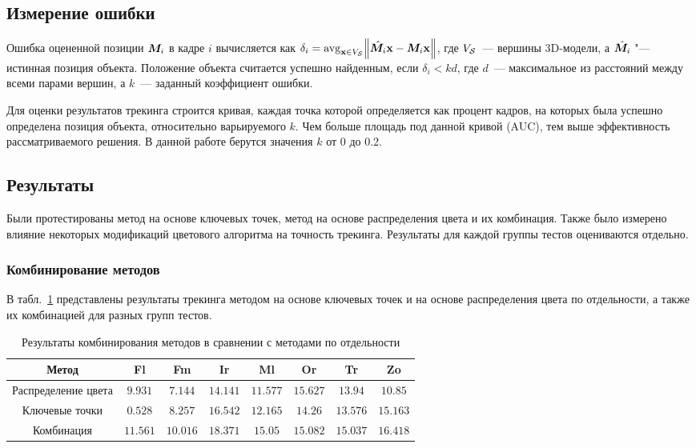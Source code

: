 \subsection{Измерение ошибки}

Ошибка оцененной позиции $\bm{M}_i$ в кадре $i$ вычисляется как
$
\delta_i = \operatorname*{avg}_{\mathbf{x} \in V_{\mathcal{S}}} \norm{\hat{\bm{M}_i} \mathbf{x} - \bm{M}_i
\mathbf{x}}
$,
где $V_{\mathcal{S}}$~--- вершины 3D-модели,
а $\hat{\bm{M}_i}$ "--- истинная позиция объекта.
Положение объекта считается успешно найденным, если $\delta_i < k d$, где
$d$~--- максимальное из расстояний между всеми парами вершин, а $k$~---
заданный коэффициент ошибки.

Для оценки результатов трекинга строится кривая, каждая точка которой
определяется как процент кадров, на которых была успешно определена позиция
объекта, относительно варьируемого $k$.
Чем больше площадь под данной кривой (AUC), тем выше эффективность
рассматриваемого решения.
В данной работе берутся значения $k$ от 0 до 0.2.

\subsection{Результаты}
Были протестированы метод на основе ключевых точек, метод на основе
распределения цвета и их комбинация.
Также было измерено влияние некоторых модификаций цветового алгоритма на
точность трекинга.
Результаты для каждой группы тестов оцениваются отдельно.

\subsubsection{Комбинирование методов}

В табл.~\ref{tab:combine} представлены результаты трекинга методом на основе
ключевых точек и на основе распределения цвета по отдельности, а также их
комбинацией для разных групп тестов.

\begin{table}[h]
\caption{\label{tab:combine}Результаты комбинирования методов в сравнении с
методами по отдельности}
\begin{center}
\begin{tabular}{|c|c|c|c|c|c|c|c|}
\hline
Метод & Fl & Fm & Ir & Ml & Or & Tr & Zo \\
\hline
Распределение цвета & $9.931$ & $7.144$ & $14.141$ & $11.577$ & $15.627$ &
$13.94$ & $10.85$ \\
\hline
Ключевые точки & $0.528$ & $8.257$ & $16.542$ & $12.165$ & $14.26$ & $13.576$ &
$15.163$ \\
\hline
Комбинация & $11.561$ & $10.016$ & $18.371$ & $15.05$ & $15.082$ & $15.037$ &
$16.418$ \\
\hline
\end{tabular}
\end{center}
\end{table}

